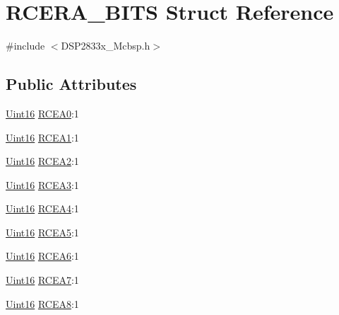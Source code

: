 \hypertarget{struct_r_c_e_r_a___b_i_t_s}{}\section{R\+C\+E\+R\+A\+\_\+\+B\+I\+T\+S Struct Reference}
\label{struct_r_c_e_r_a___b_i_t_s}


{\ttfamily \#include $<$D\+S\+P2833x\+\_\+\+Mcbsp.\+h$>$}

\subsection*{Public Attributes}
\begin{DoxyCompactItemize}
\item 
\hyperlink{_d_s_p2833x___device_8h_a59a9f6be4562c327cbfb4f7e8e18f08b}{Uint16} \hyperlink{struct_r_c_e_r_a___b_i_t_s_a873e78b783d647e903ae3883e846eb50}{R\+C\+E\+A0}\+:1
\item 
\hyperlink{_d_s_p2833x___device_8h_a59a9f6be4562c327cbfb4f7e8e18f08b}{Uint16} \hyperlink{struct_r_c_e_r_a___b_i_t_s_aa433713c8ea7ee5806aa5c9cb6ec02ea}{R\+C\+E\+A1}\+:1
\item 
\hyperlink{_d_s_p2833x___device_8h_a59a9f6be4562c327cbfb4f7e8e18f08b}{Uint16} \hyperlink{struct_r_c_e_r_a___b_i_t_s_a24e065f31e78ff1a3b89a7afd9fcb168}{R\+C\+E\+A2}\+:1
\item 
\hyperlink{_d_s_p2833x___device_8h_a59a9f6be4562c327cbfb4f7e8e18f08b}{Uint16} \hyperlink{struct_r_c_e_r_a___b_i_t_s_accf99d5977771fe639b8cb86a442459c}{R\+C\+E\+A3}\+:1
\item 
\hyperlink{_d_s_p2833x___device_8h_a59a9f6be4562c327cbfb4f7e8e18f08b}{Uint16} \hyperlink{struct_r_c_e_r_a___b_i_t_s_aa000b70c7fa56ee7d50e366959db5572}{R\+C\+E\+A4}\+:1
\item 
\hyperlink{_d_s_p2833x___device_8h_a59a9f6be4562c327cbfb4f7e8e18f08b}{Uint16} \hyperlink{struct_r_c_e_r_a___b_i_t_s_ad847206c4280c3eb29ab2cd233acf811}{R\+C\+E\+A5}\+:1
\item 
\hyperlink{_d_s_p2833x___device_8h_a59a9f6be4562c327cbfb4f7e8e18f08b}{Uint16} \hyperlink{struct_r_c_e_r_a___b_i_t_s_ae30b73469cc5baefd55d28b8561fec67}{R\+C\+E\+A6}\+:1
\item 
\hyperlink{_d_s_p2833x___device_8h_a59a9f6be4562c327cbfb4f7e8e18f08b}{Uint16} \hyperlink{struct_r_c_e_r_a___b_i_t_s_a83fd669b6208f4b2cef62d54c301e469}{R\+C\+E\+A7}\+:1
\item 
\hyperlink{_d_s_p2833x___device_8h_a59a9f6be4562c327cbfb4f7e8e18f08b}{Uint16} \hyperlink{struct_r_c_e_r_a___b_i_t_s_a9983b31bef15ff4680ff77876706c8d3}{R\+C\+E\+A8}\+:1

\end{DoxyCompactItemize}
